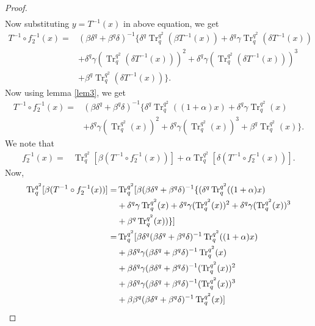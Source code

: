 \documentclass{birkjour}
\theoremstyle{definition}
\theoremstyle{remark}
\numberwithin{equation}{section}
\begin{document}
\begin{proof}
\begin{align*}
\end{align*}
	Now substituting $y=T^{-1}(x)$ in above equation, we get
	\begin{align*}
		T^{-1}\circ f_2^{-1}(x)=&(\beta\delta^{q}+\beta^{q}\delta)^{-1}\{\delta^{q}\operatorname{Tr}_{q}^{q^2}(\beta T^{-1}(x))+\delta^{q}\gamma\operatorname{Tr}_{q}^{q^2}(\delta T^{-1}(x))\\&+\delta^{q}\gamma(\operatorname{Tr}_{q}^{q^2}(\delta T^{-1}(x)))^2+\delta^{q}\gamma(\operatorname{Tr}_{q}^{q^2}(\delta T^{-1}(x)))^3\\&+\beta^{q}\operatorname{Tr}_{q}^{q^2}(\delta T^{-1}(x))\}.
	\end{align*}
	Now using lemma \ref{lem3}, we get
	\begin{align*}
		T^{-1}\circ f_2^{-1}(x)=&(\beta\delta^{q}+\beta^{q}\delta)^{-1}\{\delta^{q}\operatorname{Tr}_{q}^{q^2}((1+\alpha)x)+\delta^{q}\gamma\operatorname{Tr}_{q}^{q^2}(x)\\&+\delta^{q}\gamma(\operatorname{Tr}_{q}^{q^2}(x))^2+\delta^{q}\gamma(\operatorname{Tr}_{q}^{q^2}(x))^3+\beta^{q}\operatorname{Tr}_{q}^{q^2}(x)\}.
	\end{align*}
	 We note that
	\begin{align}
		f_2^{-1}(x)=&\operatorname{Tr}_{q}^{q^2}[\beta (T^{-1}\circ f_2^{-1}(x))]+\alpha\operatorname{Tr}_{q}^{q^2}[\delta (T^{-1}\circ f_2^{-1}(x))].\label{2c}
	\end{align}
	Now,
	\begin{align}
		\operatorname{Tr}_{q}^{q^2}[\beta (T^{-1}\circ f_2^{-1}(x))]=&\operatorname{Tr}_{q}^{q^2}[\beta (\beta\delta^{q}+\beta^{q}\delta)^{-1}\{(\delta^{q}\operatorname{Tr}_{q}^{q^2}((1+\alpha)x)\notag\\&+\delta^{q}\gamma\operatorname{Tr}_{q}^{q^2}(x)+\delta^{q}\gamma(\operatorname{Tr}_{q}^{q^2}(x))^2+\delta^{q}\gamma(\operatorname{Tr}_{q}^{q^2}(x))^3\notag\\&+\beta^{q}\operatorname{Tr}_{q}^{q^2}(x))\}]\notag\\
		=&\operatorname{Tr}_{q}^{q^2}[\beta\delta^{q}(\beta\delta^{q}+\beta^{q}\delta)^{-1}\operatorname{Tr}_{q}^{q^2}((1+\alpha)x)\notag\\&+\beta\delta^{q}\gamma(\beta\delta^{q}+\beta^{q}\delta)^{-1}\operatorname{Tr}_{q}^{q^2}(x)\notag\\&+\beta\delta^{q}\gamma(\beta\delta^{q}+\beta^{q}\delta)^{-1}(\operatorname{Tr}_{q}^{q^2}(x))^2\notag\\&+\beta\delta^{q}\gamma(\beta\delta^{q}+\beta^{q}\delta)^{-1}(\operatorname{Tr}_{q}^{q^2}(x))^3\notag\\&+\beta\beta^{q}(\beta\delta^{q}+\beta^{q}\delta)^{-1}\operatorname{Tr}_{q}^{q^2}(x)]\notag\\

\end{align}
\end{proof}
\end{document}
